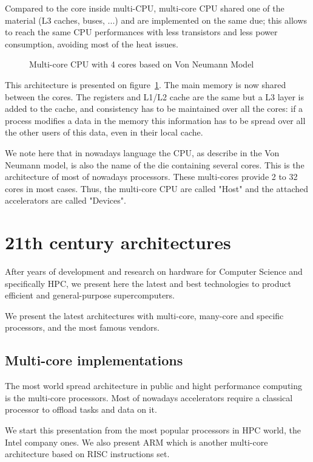 Compared to the core inside multi-CPU, multi-core CPU shared one of the material (L3 caches, buses, ...) and are implemented on the same due; this allows to reach the same CPU performances with less transistors and less power consumption, avoiding most of the heat issues. 

\begin{figure}
\centering 

\caption{Multi-core CPU with 4 cores based on Von Neumann Model}
\label{fig:2_HARD:von_neumann_model_multi-core}
\end{figure}

This architecture is presented on figure~\ref{fig:2_HARD:von_neumann_model_multi-core}.
The main memory is now shared between the cores. 
The registers and L1/L2 cache are the same but a L3 layer is added to the cache, and consistency has to be maintained over all the cores: if a process modifies a data in the memory this information has to be spread over all the other users of this data, even in their local cache. 

We note here that in nowadays language the CPU, as describe in the Von Neumann model, is also the name of the die containing several cores. 
This is the architecture of most of nowadays processors. 
These multi-cores provide 2 to 32 cores in most cases. 
Thus, the multi-core CPU are called "Host" and the attached accelerators are called "Devices".

\section{21th century architectures}
After years of development and research on hardware for Computer Science and specifically HPC, we present here the latest and best technologies to product efficient and general-purpose supercomputers.

We present the latest architectures with multi-core, many-core and specific processors, and the most famous vendors. 

\subsection{Multi-core implementations}
The most world spread architecture in public and hight performance computing is the multi-core processors. 
Most of nowadays accelerators require a classical processor to offload tasks and data on it. 

We start this presentation from the most popular processors in HPC world, the Intel company ones. 
We also present ARM which is another multi-core architecture based on RISC instructions set.

